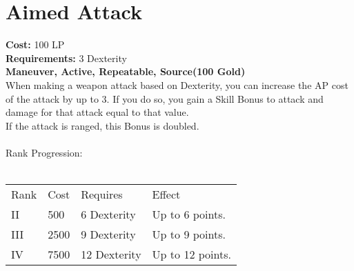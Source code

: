 \section{Aimed Attack}\label{maneuver:aimedAttack}
\textbf{Cost:} 100 LP\\
\textbf{Requirements:} 3 Dexterity\\
\textbf{Maneuver, Active, Repeatable, Source(100 Gold)}\\
When making a weapon attack based on Dexterity, you can increase the AP cost of the attack by up to 3.
If you do so, you gain a Skill Bonus to attack and damage for that attack equal to that value.\\
If the attack is ranged, this Bonus is doubled.\\
\\
Rank Progression:\\
\\
\begin{tabular}{l | l | l | l}
	Rank & Cost & Requires & Effect\\
	II & 500 & 6 Dexterity & Up to 6 points.\\
	III & 2500 & 9 Dexterity & Up to 9 points.\\
	IV & 7500 & 12 Dexterity & Up to 12 points.\\
\end{tabular}